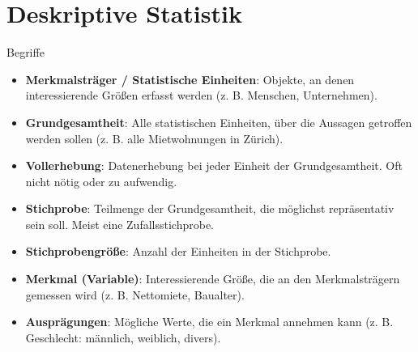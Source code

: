 \section{Deskriptive Statistik}

\begin{terms}{Begriffe}
    \\
    \begin{itemize}
        \item \textbf{Merkmalsträger / Statistische Einheiten}: Objekte, an denen interessierende Größen erfasst werden (z. B. Menschen, Unternehmen).
        \item \textbf{Grundgesamtheit}: Alle statistischen Einheiten, über die Aussagen getroffen werden sollen (z. B. alle Mietwohnungen in Zürich).
        \item \textbf{Vollerhebung}: Datenerhebung bei jeder Einheit der Grundgesamtheit. Oft nicht nötig oder zu aufwendig.
        \item \textbf{Stichprobe}: Teilmenge der Grundgesamtheit, die möglichst repräsentativ sein soll. Meist eine Zufallsstichprobe.
        \item \textbf{Stichprobengröße}: Anzahl der Einheiten in der Stichprobe.
        \item \textbf{Merkmal (Variable)}: Interessierende Größe, die an den Merkmalsträgern gemessen wird (z. B. Nettomiete, Baualter).
        \item \textbf{Ausprägungen}: Mögliche Werte, die ein Merkmal annehmen kann (z. B. Geschlecht: männlich, weiblich, divers).
    \end{itemize}
\end{terms}


